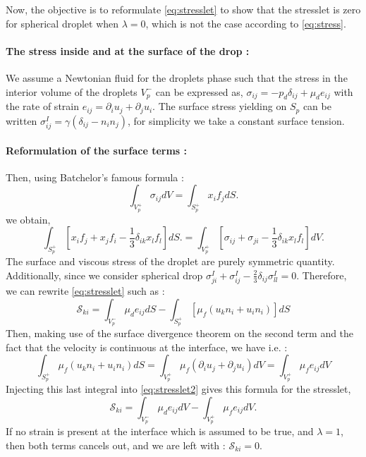 \documentclass[12pt]{My_preprint}
\renewcommand{\ref}[1]{\autoref{#1}}
\begin{document}
Now, the objective is to reformulate \ref{eq:stresslet} to show that the stresslet is zero for spherical droplet when $\lambda=0$, which is not the case according to \ref{eq:stress}.



\paragraph*{The stress inside and at the surface of the drop :}

We assume a Newtonian fluid for the droplets phase such that the stress in the interior volume of the droplets $V^-_p$ can be expressed as, $\sigma_{ij} = - p_d \delta_{ij} + \mu_d e_{ij}$ with the rate of strain $e_{ij} = \partial_i u_j + \partial_j u_i$. 
The surface stress yielding on $S_p$ can be written $\sigma^I_{ij} = \gamma (\delta_{ij} - n_in_j)$, for simplicity we take a constant surface tension. 


\paragraph*{Reformulation of the surface terms :}
Then, using Batchelor’s famous formula :
\begin{equation*}
    \int_{V^+_p} \sigma_{ij} dV 
    = \int_{S^+_p} x_i f_j dS.
    \label{eq:bachelor}
\end{equation*}
 we obtain, 
\begin{equation}
    \int_{S^+_p} \left[
        x_i f_j+ x_j f_i - \frac{1}{3}\delta_{ik}x_lf_l
    \right]  dS.
    = \int_{V^+_p} \left[
        \sigma_{ij} 
        + \sigma_{ji} 
        - \frac{1}{3}\delta_{ik}x_lf_l
        \right]
    dV.
\end{equation}
The surface and viscous stress of the droplet are purely symmetric quantity.
Additionally, since we consider spherical drop $\sigma^I_{ji} + \sigma^I_{ij} -\frac{2}{3}\delta_{ij}\sigma_{ll}^I = 0$.
Therefore, we can rewrite \ref{eq:stresslet} such as :
\begin{equation}
    \label{eq:stresslet2}
    \mathscr{S}_{ki}
    = 
    \int_{V_p^-}
        \mu_d e_{ij} 
    dS
    - \int_{S_p^+}
    \left[
         \mu_f (u_k n_i+u_i n_i)
    \right]
    dS
\end{equation}
Then, making use of the surface divergence theorem on the second term and the fact that the velocity is continuous at the interface, we have i.e. :
\begin{equation*}
    \int_{S_p^+}
        \mu_f (u_k n_i+u_i n_i)
    dS
    = 
    \int_{V_p^+}
        \mu_f (\partial_i u_j + \partial_j u_i)
    dV
    = 
    \int_{V_p^+}
        \mu_f e_{ij}
    dV
\end{equation*}
Injecting this last integral into \ref{eq:stresslet2} gives this formula for the stresslet, 
\begin{equation}
    \mathscr{S}_{ki}
    = 
    \int_{V_p^-}
        \mu_d e_{ij} 
    dV
    - \int_{V_p^+}
    \mu_f e_{ij}
    dV.
    \label{eq:final_stress}
\end{equation}
If no strain is present at the interface which is assumed to be true, and $\lambda =1$, then both terms cancels out, and we are left with :  
$\mathscr{S}_{ki}
= 0$. 
\end{document}

